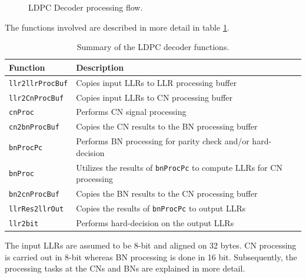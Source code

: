 \documentclass{article}
\begin{document}
\begin{figure}[ht]

  \caption{LDPC Decoder processing flow.}
\end{figure}

The functions involved are described in more detail in table \ref{tab:sum_func}.

\begin{table}[ht]
  \centering
  \begin{tabular}{ll}
    \toprule
    \textbf{Function} & \textbf{Description} \\
    \midrule
    \texttt{llr2llrProcBuf} & Copies input LLRs to LLR processing buffer \\
    \texttt{llr2CnProcBuf}  & Copies input LLRs to CN  processing buffer \\
    \texttt{cnProc}         & Performs CN signal processing \\
    \texttt{cn2bnProcBuf}   & Copies the CN results to the BN processing buffer \\
    \texttt{bnProcPc}       & Performs BN processing for parity check and/or hard-decision \\
    \texttt{bnProc}         & Utilizes the results of \texttt{bnProcPc} to compute LLRs for CN processing \\
    \texttt{bn2cnProcBuf}   & Copies the BN results to the CN processing buffer \\
    \texttt{llrRes2llrOut}  & Copies the results of \texttt{bnProcPc} to output LLRs \\
    \texttt{llr2bit}        & Performs hard-decision on the output LLRs \\
    \bottomrule
  \end{tabular}
  \caption{Summary of the LDPC decoder functions.}
  \label{tab:sum_func}
\end{table}

The input LLRs are assumed to be 8-bit and aligned on 32 bytes. CN processing is carried out in 8-bit whereas BN processing is done in 16 bit. Subsequently, the processing tasks at the CNs and BNs are explained in more detail.
\end{document}

